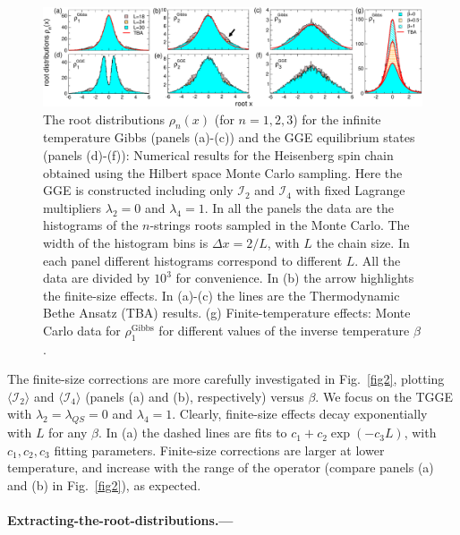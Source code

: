 \documentclass[twocolumn,superscriptaddress,prb,10pt]{revtex4-1}
\begin{document}
\begin{figure}[t]
\includegraphics*[width=0.99\linewidth]{./fig3}
\caption{The root distributions $\rho_n(x)$ (for $n=1,2,3$) for the infinite temperature 
 Gibbs (panels (a)-(c)) and the GGE equilibrium states (panels (d)-(f)): Numerical  
 results for the Heisenberg spin chain obtained using the Hilbert space Monte Carlo 
 sampling. Here the GGE is constructed including only ${\mathcal I}_2$ and ${\mathcal I}_4$ 
 with fixed Lagrange multipliers $\lambda_2=0$ and $\lambda_4=1$. In all the panels the 
 data are the histograms of the $n$-strings roots sampled in the Monte Carlo.
 The width of the histogram bins is $\Delta x=2/L$, with $L$ the chain size. 
 In each panel different histograms correspond to different $L$. All the data are divided 
 by $10^3$ for convenience. In (b) the arrow highlights the finite-size effects. In 
 (a)-(c) the lines are the Thermodynamic Bethe Ansatz (TBA) results. (g) Finite-temperature 
 effects: Monte Carlo data for $\rho^{\textrm{Gibbs}}_1$ for different values of the 
 inverse temperature $\beta$.
}
\label{fig3}
\end{figure}


The finite-size corrections are more carefully investigated in Fig.~\ref{fig2},   
plotting $\langle{\mathcal I}_2\rangle$ and $\langle {\mathcal I}_4
\rangle$ (panels (a) and (b), respectively) versus $\beta$. We focus on 
the TGGE with $\lambda_2=\lambda_{QS}=0$ and $\lambda_4=1$. Clearly,  
finite-size effects decay exponentially~\cite{iyer-2015} with $L$ for any $\beta$. In (a) the dashed 
lines are fits to $c_1+c_2\exp(-c_3L)$, with $c_1,c_2,c_3$ fitting parameters. 
Finite-size  corrections are larger at lower temperature, and increase with the 
range of the operator (compare panels  (a) and (b) in Fig.~\ref{fig2}), as expected. 

\paragraph*{Extracting-the-root-distributions.---}
\end{document}

